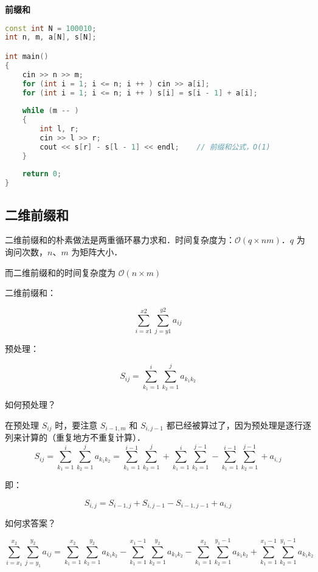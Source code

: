 \textbf{前缀和}
\begin{lstlisting}[language=cpp]
const int N = 100010;
int n, m, a[N], s[N];

int main() 
{
    cin >> n >> m;
    for (int i = 1; i <= n; i ++ ) cin >> a[i];
    for (int i = 1; i <= n; i ++ ) s[i] = s[i - 1] + a[i];
    
    while (m -- )
    {
        int l, r;
        cin >> l >> r;
        cout << s[r] - s[l - 1] << endl;    // 前缀和公式，O(1)
    }
    
    return 0;
}
\end{lstlisting}

\subsection{二维前缀和}

二维前缀和的朴素做法是两重循环暴力求和．时间复杂度为：$\mathcal{O}(q \times nm)$．$q$ 为询问次数，$n$、$m$ 为矩阵大小．

而二维前缀和的时间复杂度为 $\mathcal{O}(n \times m)$

二维前缀和：

\begin{equation}
\sum^{x2}_{i = x1}\sum^{y2}_{j = y1} a_{ij}
\end{equation}

预处理：

\begin{equation}
S_{ij} = \sum^{i}_{k_1 = 1} \sum^{j}_{k_2 = 1} a_{k_1 k_2}
\end{equation}

如何预处理？

在预处理 $S_{ij}$ 时，要注意 $S_{i - 1, m}$ 和 $S_{i, j - 1}$ 都已经被算过了，因为预处理是逐行逐列来计算的（重复地方不重复计算）．
\begin{equation}
S_{ij} = \sum^{i}_{k_1 = 1} \sum^{j}_{k_2 = 1} a_{k_1 k_2} = \sum^{i - 1}_{k_1 = 1} \sum^{j}_{k_2 = 1} + \sum^{i}_{k_1 = 1} \sum^{j - 1}_{k_2 = 1} - \sum^{i- 1}_{k_1 = 1} \sum^{j - 1}_{k_2 = 1} + a_{i, j}
\end{equation}

即：

\begin{equation}
S_{i, j} = S_{i - 1, j} + S_{i, j - 1} - S_{i - 1, j - 1} + a_{i, j}
\end{equation}

如何求答案？

\begin{equation}
\sum^{x_2}_{i = x_1}\sum^{y_2}_{j = y_1} a_{ij} = \sum^{x_2}_{k_1 = 1} \sum^{y_2}_{k_2 = 1} a_{k_1 k_2} - \sum^{x_1 - 1}_{k_1 = 1} \sum^{y_2}_{k_2 = 1} a_{k_1 k_2} - \sum^{x_2}_{k_1 = 1} \sum^{y_1 - 1}_{k_2 = 1} a_{k_1 k_2} + \sum^{x_1 - 1}_{k_1 = 1} \sum^{y_1 - 1}_{k_2 = 1} a_{k_1 k_2}
\end{equation}

